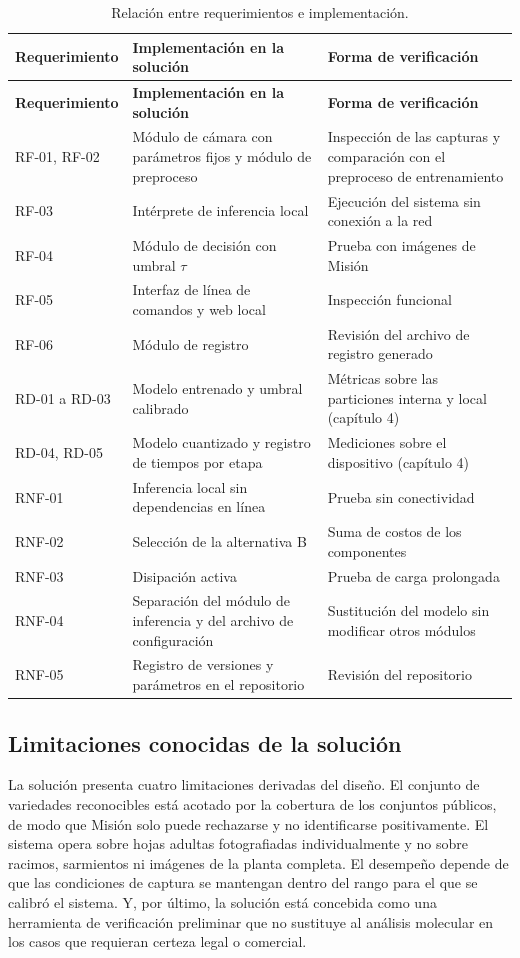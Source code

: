 \begin{longtable}{L{2.9cm}L{5.0cm}L{5.8cm}}
\caption{Relación entre requerimientos e implementación.}
\label{tab:cobertura3} \\
\toprule
\textbf{Requerimiento} & \textbf{Implementación en la solución} & \textbf{Forma de verificación} \\
\midrule
\endfirsthead
\toprule
\textbf{Requerimiento} & \textbf{Implementación en la solución} & \textbf{Forma de verificación} \\
\midrule
\endhead
RF-01, RF-02 & Módulo de cámara con parámetros fijos y módulo de preproceso & Inspección de las capturas y comparación con el preproceso de entrenamiento \\
RF-03 & Intérprete de inferencia local & Ejecución del sistema sin conexión a la red \\
RF-04 & Módulo de decisión con umbral $\tau$ & Prueba con imágenes de Misión \\
RF-05 & Interfaz de línea de comandos y web local & Inspección funcional \\
RF-06 & Módulo de registro & Revisión del archivo de registro generado \\
RD-01 a RD-03 & Modelo entrenado y umbral calibrado & Métricas sobre las particiones interna y local (capítulo 4) \\
RD-04, RD-05 & Modelo cuantizado y registro de tiempos por etapa & Mediciones sobre el dispositivo (capítulo 4) \\
RNF-01 & Inferencia local sin dependencias en línea & Prueba sin conectividad \\
RNF-02 & Selección de la alternativa B & Suma de costos de los componentes \\
RNF-03 & Disipación activa & Prueba de carga prolongada \\
RNF-04 & Separación del módulo de inferencia y del archivo de configuración & Sustitución del modelo sin modificar otros módulos \\
RNF-05 & Registro de versiones y parámetros en el repositorio & Revisión del repositorio \\
\bottomrule
\end{longtable}

\subsection{Limitaciones conocidas de la solución}

La solución presenta cuatro limitaciones derivadas del diseño. El conjunto de
variedades reconocibles está acotado por la cobertura de los conjuntos
públicos, de modo que Misión solo puede rechazarse y no identificarse
positivamente. El sistema opera sobre hojas adultas fotografiadas
individualmente y no sobre racimos, sarmientos ni imágenes de la planta
completa. El desempeño depende de que las condiciones de captura se
mantengan dentro del rango para el que se calibró el sistema. Y, por último,
la solución está concebida como una herramienta de verificación preliminar
que no sustituye al análisis molecular en los casos que requieran certeza
legal o comercial.

